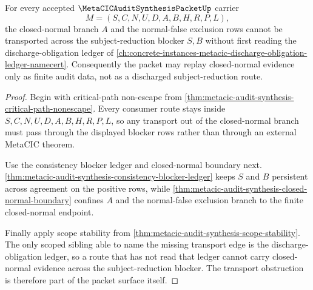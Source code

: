 \begin{theorem}
\label{thm:metacic-audit-synthesis-transport-obstruction}
For every accepted $\MetaCICAuditSynthesisPacketUp$ carrier
$$
M=(S,C,N,U,D,A,B,H,R,P,L),
$$
the closed-normal branch $A$ and the normal-false exclusion rows cannot be transported across the subject-reduction blocker $S,B$ without first reading the discharge-obligation ledger of \autoref{ch:concrete-instances-metacic-discharge-obligation-ledger-namecert}. Consequently the packet may replay closed-normal evidence only as finite audit data, not as a discharged subject-reduction route.
\end{theorem}
\begin{proof}
Begin with critical-path non-escape from \autoref{thm:metacic-audit-synthesis-critical-path-nonescape}. Every consumer route stays inside $S,C,N,U,D,A,B,H,R,P,L$, so any transport out of the closed-normal branch must pass through the displayed blocker rows rather than through an external MetaCIC theorem.

Use the consistency blocker ledger and closed-normal boundary next. \autoref{thm:metacic-audit-synthesis-consistency-blocker-ledger} keeps $S$ and $B$ persistent across agreement on the positive rows, while \autoref{thm:metacic-audit-synthesis-closed-normal-boundary} confines $A$ and the normal-false exclusion branch to the finite closed-normal endpoint.

Finally apply scope stability from \autoref{thm:metacic-audit-synthesis-scope-stability}. The only scoped sibling able to name the missing transport edge is the discharge-obligation ledger, so a route that has not read that ledger cannot carry closed-normal evidence across the subject-reduction blocker. The transport obstruction is therefore part of the packet surface itself.
\end{proof}

